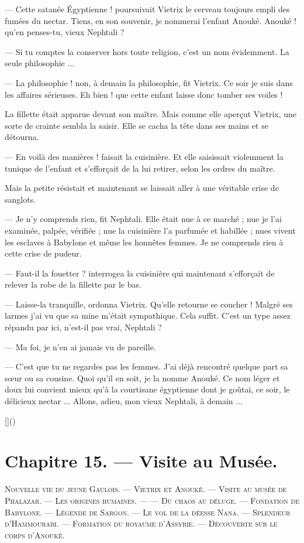 \documentclass[a4paper, 11pt, oneside, polutonikogreek, french]{article}
\begin{document}
--- Cette satanée Égyptienne ! poursuivait Vietrix le cerveau toujours empli des fumées du nectar. Tiens, en son souvenir, je nommerai l'enfant Anouké. Anouké ! qu'en penses-tu, vieux Nephtali ?

--- Si tu comptes la conserver hors toute religion, c'est un nom évidemment. La seule philosophie ...

--- La philosophie ! non, à demain la philosophie, fit Vietrix. Ce soir je suis dans les affaires sérieuses. Eh bien ! que cette enfant laisse donc tomber ses voiles !

La fillette était apparue devant son maître. Mais comme elle aperçut Vietrix, une sorte de crainte sembla la saisir. Elle se cacha la tête dans ses mains et se détourna.

--- En voilà des manières ! faisait la cuisinière. Et elle saisissait violemment la tunique de l'enfant et s'efforçait de la lui retirer, selon les ordres du maître.

Mais la petite résistait et maintenant se laissait aller à une véritable crise de sanglots.

--- Je n'y comprends rien, fit Nephtali. Elle était nue à ce marché ; nue je l'ai examinée, palpée, vérifiée ; nue la cuisinière l'a parfumée et habillée ; nues vivent les esclaves à Babylone et même les honnêtes femmes. Je ne comprends rien à cette crise de pudeur.

--- Faut-il la fouetter ? interrogea la cuisinière qui maintenant s'efforçait de relever la robe de la fillette par le bas.

--- Laisse-la tranquille, ordonna Vietrix. Qu'elle retourne se coucher ! Malgré ses larmes j'ai vu que sa mine m'était sympathique. Cela suffit. C'est un type assez répandu par ici, n'est-il pas vrai, Nephtali ?

--- Ma foi, je n'en ai jamais vu de pareille.

--- C'est que tu ne regardes pas les femmes. J'ai déjà rencontré quelque part sa sœur ou sa cousine. Quoi qu'il en soit, je la nomme Anouké. Ce nom léger et doux lui convient mieux qu'à la courtisane égyptienne dont je goûtai, ce soir, le délicieux nectar ... Allons, adieu, mon vieux Nephtali, à demain ...

[]()
\clearpage
\section{Chapitre 15. --- Visite au Musée.}
\begin{center}
\scshape
\small
Nouvelle vie du jeune Gaulois. --- Vietrix et Anouké. --- Visite au musée de Phalazar. --- Les origines humaines. --- --- Du chaos au déluge. --- Fondation de Babylone. --- Légende de Sargon. --- Le vol de la déesse Nana. --- Splendeur d'Hammourabi. --- Formation du royaume d'Assyrie. --- Découverte sur le corps d'Anouké.
\end{center}
\end{document}
